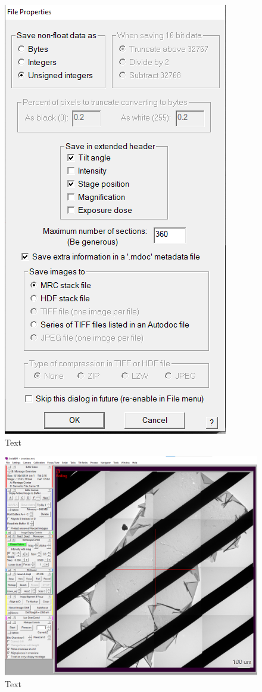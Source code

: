\documentclass[12pt, a4paper]{scrartcl}
\begin{document}
\begin{figure}[H]
\includegraphics[scale=1]{screenshots/OverviewSetup2.png}
\caption{Text}
\end{figure}

\begin{figure}[H]
\includegraphics[width=\linewidth]{screenshots/Overview.png}
\caption{Text}
\end{figure}
\end{document}
